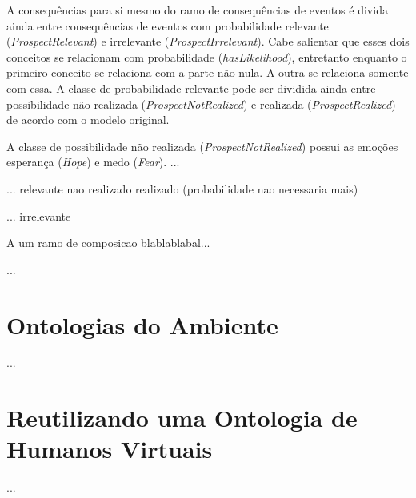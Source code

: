A consequências para si mesmo do ramo de consequências de eventos é divida
ainda entre consequências de eventos com probabilidade relevante
(\emph{ProspectRelevant}) e irrelevante (\emph{ProspectIrrelevant}). Cabe
salientar que esses dois conceitos se relacionam com probabilidade
(\emph{hasLikelihood}), entretanto enquanto o primeiro conceito se relaciona
com a parte não nula. A outra se relaciona somente com essa.
A classe de probabilidade relevante pode ser dividida ainda entre
possibilidade não realizada (\emph{ProspectNotRealized}) e realizada
(\emph{ProspectRealized}) de acordo com o modelo original.

A classe de possibilidade não realizada (\emph{ProspectNotRealized}) possui as
emoções esperança (\emph{Hope}) e medo (\emph{Fear}). ...

... relevante
	nao realizado
	realizado (probabilidade nao necessaria mais)

... irrelevante 

A um ramo de composicao blablablabal...


...

\section{Ontologias do Ambiente} \label{cap:tp:oda}

...

\section{Reutilizando uma Ontologia de Humanos Virtuais} \label{cap:tp:ruodhv}

...
